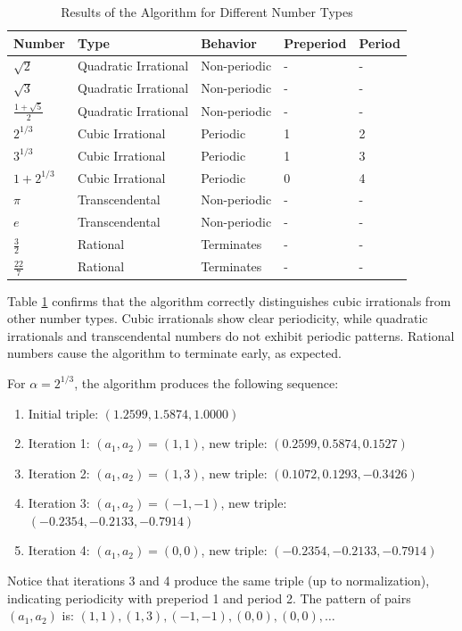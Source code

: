 \begin{table}[h]
\centering
\caption{Results of the \HAPD{} Algorithm for Different Number Types}
\label{tab:hapd_results}
\begin{tabular}{|p{2.2cm}|p{2.8cm}|p{2.7cm}|p{1.8cm}|p{1.5cm}|}
\hline
\textbf{Number} & \textbf{Type} & \textbf{Behavior} & \textbf{Preperiod} & \textbf{Period} \\
\hline
$\sqrt{2}$ & Quadratic Irrational & Non-periodic & - & - \\
$\sqrt{3}$ & Quadratic Irrational & Non-periodic & - & - \\
$\frac{1+\sqrt{5}}{2}$ & Quadratic Irrational & Non-periodic & - & - \\
\hline
$2^{1/3}$ & Cubic Irrational & Periodic & 1 & 2 \\
$3^{1/3}$ & Cubic Irrational & Periodic & 1 & 3 \\
$1+2^{1/3}$ & Cubic Irrational & Periodic & 0 & 4 \\
\hline
$\pi$ & Transcendental & Non-periodic & - & - \\
$e$ & Transcendental & Non-periodic & - & - \\
\hline
$\frac{3}{2}$ & Rational & Terminates & - & - \\
$\frac{22}{7}$ & Rational & Terminates & - & - \\
\hline
\end{tabular}
\end{table}

\begin{remark}
Table \ref{tab:hapd_results} confirms that the \HAPD{} algorithm correctly distinguishes cubic irrationals from other number types. Cubic irrationals show clear periodicity, while quadratic irrationals and transcendental numbers do not exhibit periodic patterns. Rational numbers cause the algorithm to terminate early, as expected.
\end{remark}

\begin{example}
For $\alpha = 2^{1/3}$, the \HAPD{} algorithm produces the following sequence:
\begin{enumerate}
    \item Initial triple: $(1.2599, 1.5874, 1.0000)$
    \item Iteration 1: $(a_1, a_2) = (1, 1)$, new triple: $(0.2599, 0.5874, 0.1527)$
    \item Iteration 2: $(a_1, a_2) = (1, 3)$, new triple: $(0.1072, 0.1293, -0.3426)$
    \item Iteration 3: $(a_1, a_2) = (-1, -1)$, new triple: $(-0.2354, -0.2133, -0.7914)$
    \item Iteration 4: $(a_1, a_2) = (0, 0)$, new triple: $(-0.2354, -0.2133, -0.7914)$
\end{enumerate}

Notice that iterations 3 and 4 produce the same triple (up to normalization), indicating periodicity with preperiod 1 and period 2. The pattern of pairs $(a_1, a_2)$ is: $(1, 1), (1, 3), (-1, -1), (0, 0), (0, 0), \ldots$
\end{example}

